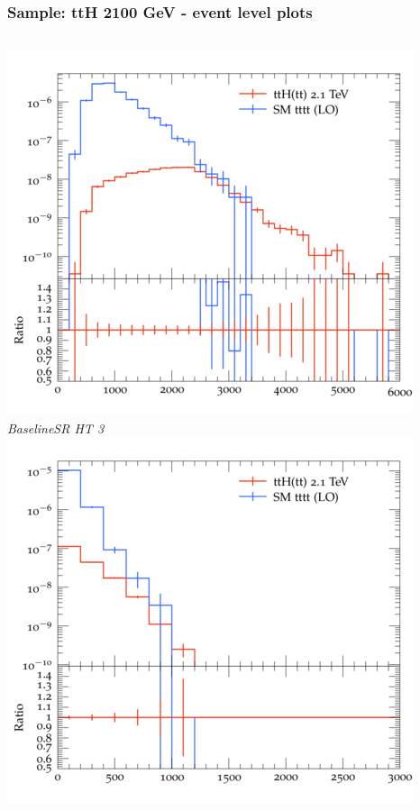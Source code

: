\documentclass{beamer}
\begin{document}
\begin{frame}
\frametitle{Sample: ttH 2100 GeV - event level plots}
\begin{columns}
\includegraphics[width=\textwidth]{../plots/ttH_2100/tttt_ttH_1LOS/BaselineSR_HT_3.png}\\
\textit{\small BaselineSR HT 3}
\includegraphics[width=\textwidth]{../plots/ttH_2100/tttt_ttH_1LOS/BaselineSR_MET.png}\\

\end{columns}
\end{frame}
\end{document}
